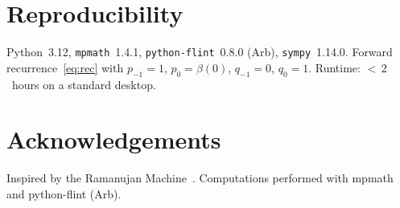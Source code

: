 \documentclass[11pt,a4paper]{article}
\theoremstyle{plain}
\theoremstyle{definition}
\theoremstyle{remark}
\begin{document}
\section{Reproducibility}\label{app:repro}

Python~3.12, \texttt{mpmath}~1.4.1,
\texttt{python-flint}~0.8.0 (Arb),
\texttt{sympy}~1.14.0.
Forward recurrence~\eqref{eq:rec} with
$p_{-1}{=}1$, $p_0{=}\beta(0)$, $q_{-1}{=}0$, $q_0{=}1$.
Runtime: ${<}\,2$~hours on a standard desktop.

\section*{Acknowledgements}

Inspired by the Ramanujan Machine~\cite{raayoni2021,elimelech2024}.
Computations performed with mpmath and python-flint (Arb).
\end{document}
